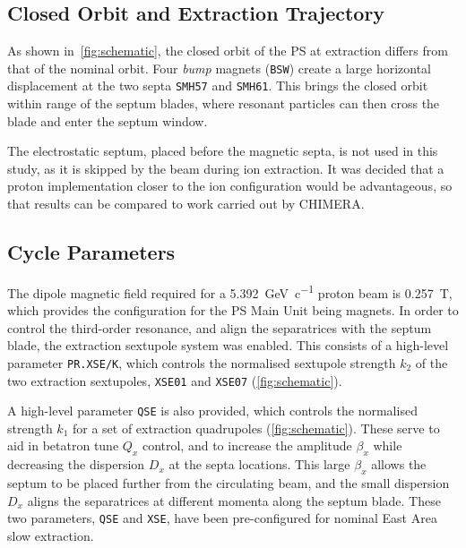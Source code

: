\documentclass[a4paper,twoside,11pt]{report}
\begin{document}
\subsection{Closed Orbit and Extraction Trajectory}

As shown in~\autoref{fig:schematic}, the closed orbit of the PS at extraction differs from that of the nominal orbit. Four \textit{bump} magnets (\verb|BSW|) create a large horizontal displacement at the two septa \verb|SMH57| and \verb|SMH61|. This brings the closed orbit within range of the septum blades, where resonant particles can then cross the blade and enter the septum window.

The electrostatic septum, placed before the magnetic septa, is not used in this study, as it is skipped by the beam during ion extraction. It was decided that a proton implementation closer to the ion configuration would be advantageous, so that results can be compared to work carried out by CHIMERA.

\subsection{Cycle Parameters}\label{sec:magcycle}

The dipole magnetic field required for a \qty[per-mode=symbol]{5.392}{\giga\electronvolt\per~c} proton beam is \qty{0.257}{\tesla}, which provides the configuration for the PS Main Unit being magnets. In order to control the third-order resonance, and align the separatrices with the septum blade, the extraction sextupole system was enabled. This consists of a high-level parameter \verb|PR.XSE/K|, which controls the normalised sextupole strength $k_2$ of the two extraction sextupoles, \verb|XSE01| and \verb|XSE07| (\autoref{fig:schematic}). 

A high-level parameter \verb|QSE| is also provided, which controls the normalised strength $k_1$ for a set of extraction quadrupoles (\autoref{fig:schematic}). These serve to aid in betatron tune $Q_x$ control, and to increase the amplitude $\beta_x$ while decreasing the dispersion $D_x$ at the septa locations. This large $\beta_x$ allows the septum to be placed further from the circulating beam, and the small dispersion $D_x$ aligns the separatrices at different momenta along the septum blade. These two parameters, \verb|QSE| and \verb|XSE|, have been pre-configured for nominal East Area slow extraction.
\end{document}
